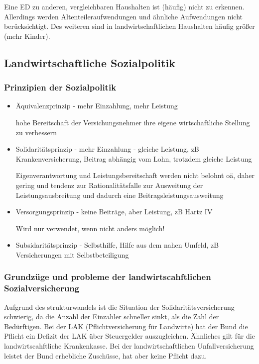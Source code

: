 \documentclass[11pt]{scrbook}
\begin{document}
Eine \ac{ED} zu anderen, vergleichbaren Haushalten ist (häufig) nicht zu erkennen.
Allerdings werden Altenteileraufwendungen und ähnliche Aufwendungen nicht berücksichtigt.
Des weiteren sind in landwirtschaftlichen Haushalten häufig größer (mehr Kinder).

\subsection{Landwirtschaftliche Sozialpolitik}

\subsubsection{Prinzipien der Sozialpolitik}

\begin{itemize}
	\item Äquivalenzprinzip - mehr Einzahlung, mehr Leistung

		hohe Bereitschaft der Versichungsnehmer ihre eigene wirtschaftliche Stellung zu verbessern
	\item Solidaritätsprinzip - mehr Einzahlung - gleiche Leistung, zB Krankenversicherung, Beitrag abhängig vom Lohn, trotzdem gleiche Leistung

		Eigenverantwortung und Leistungsbereitschaft werden nicht belohnt oä, daher gering und tendenz zur Rationalitätsfalle zur Ausweitung der Leistungsausbreitung und dadurch eine Beitragsleistungsausweitung

	\item Versorgungsprinzip - keine Beiträge, aber Leistung, zB Hartz IV

		Wird nur verwendet, wenn nicht anders möglich!
	\item Subsidaritätsprinzip - Selbsthilfe, Hilfe aus dem nahen Umfeld, zB Versicherungen mit Selbstbeteiligung
\end{itemize}

\subsubsection{Grundzüge und probleme der landwirtscahftlichen Sozialversicherung}

Aufgrund des strukturwandels ist die Situation der Solidaritätsversicherung schwierig, da die Anzahl der Einzahler schneller sinkt, als die Zahl der Bedürftigen.
Bei der \ac{LAK} (Pflichtversicherung für Landwirte) hat der Bund die Pflicht ein Defizit der \ac{LAK} über Steuergelder auszugleichen.
Ähnliches gilt für die landwirtscahftliche Krankenkasse.
Bei der landwirtschaftlichen Unfallversicherung leistet der Bund erhebliche Zuschüsse, hat aber keine Pflicht dazu.
\end{document}
